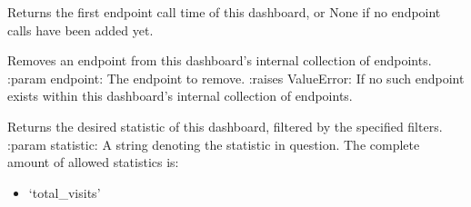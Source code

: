 \documentclass[letterpaper,10pt,english]{sphinxmanual}
\begin{document}
\begin{fulllineitems}
\begin{fulllineitems}
\end{fulllineitems}


\begin{fulllineitems}
\label{\detokenize{pydash_app.dashboard.entity:pydash_app.dashboard.entity.Dashboard.first_endpoint_call_time}}
Returns the first endpoint call time of this dashboard, or None if no endpoint calls have been added yet.

\end{fulllineitems}


\begin{fulllineitems}
\label{\detokenize{pydash_app.dashboard.entity:pydash_app.dashboard.entity.Dashboard.get_id}}
\end{fulllineitems}


\begin{fulllineitems}
\label{\detokenize{pydash_app.dashboard.entity:pydash_app.dashboard.entity.Dashboard.remove_endpoint}}
Removes an endpoint from this dashboard’s internal collection of endpoints.
:param endpoint: The endpoint to remove.
:raises ValueError: If no such endpoint exists within this dashboard’s internal collection of endpoints.

\end{fulllineitems}


\begin{fulllineitems}
\label{\detokenize{pydash_app.dashboard.entity:pydash_app.dashboard.entity.Dashboard.statistic}}
Returns the desired statistic of this dashboard, filtered by the specified filters.
:param statistic: A string denoting the statistic in question. The complete amount of allowed statistics is:
\begin{itemize}
\item {} 
‘total\_visits’


\end{itemize}
\end{fulllineitems}
\end{fulllineitems}
\end{document}
